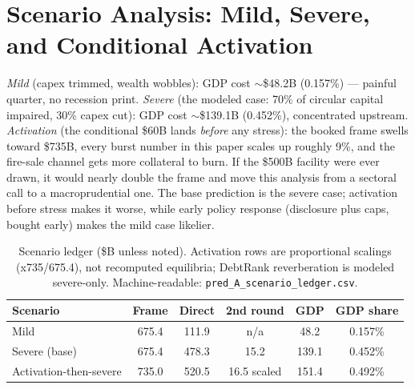 \documentclass[11pt,a4paper]{article}
\begin{document}
\section{Scenario Analysis: Mild, Severe, and Conditional Activation}\label{sec:scenarios}
\emph{Mild} (capex trimmed, wealth wobbles): GDP cost $\sim$\$48.2B
(0.157\%) --- painful quarter, no recession print. \emph{Severe} (the
modeled case: 70\% of circular capital impaired, 30\% capex cut): GDP cost
$\sim$\$139.1B (0.452\%), concentrated upstream. \emph{Activation} (the
conditional \$60B lands \emph{before} any stress): the booked frame swells
toward \$735B, every burst number in this paper scales up roughly 9\%, and
the fire-sale channel gets more collateral to burn. If the \$500B facility
were ever drawn, it would nearly double the frame and move this analysis
from a sectoral call to a macroprudential one. The base prediction is
the severe case; activation before stress makes it worse, while early policy
response (disclosure plus caps, bought early) makes the mild case likelier.

\begin{table}[htbp]
\centering
\caption{Scenario ledger (\$B unless noted). Activation rows are proportional scalings (x735/675.4), not recomputed equilibria; DebtRank reverberation is modeled severe-only. Machine-readable: \texttt{pred\_A\_scenario\_ledger.csv}.}
    \label{tab:14-scenario-ledger-b-unless}
\begin{tabular}{lccccc}
\toprule
Scenario & Frame & Direct & 2nd round & GDP & GDP share \\
\midrule
Mild & 675.4 & 111.9 & n/a & 48.2 & 0.157\% \\
Severe (base) & 675.4 & 478.3 & 15.2 & 139.1 & 0.452\% \\
Activation-then-severe & 735.0 & 520.5 & 16.5 scaled & 151.4 & 0.492\% \\
\bottomrule
\end{tabular}
\end{table}
\end{document}

